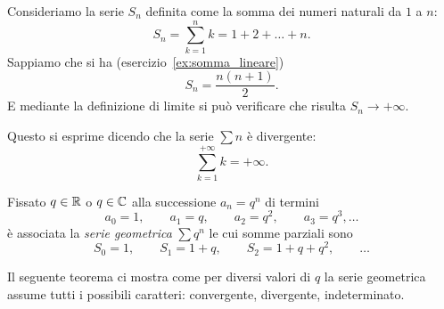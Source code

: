 \begin{example}
Consideriamo la serie $S_n$ definita
come la somma dei numeri naturali da $1$ a $n$:
\[
  S_n = \sum_{k=1}^n k = 1 + 2 + \dots + n.
\]
Sappiamo che si ha (esercizio~\ref{ex:somma_lineare})
\[
  S_n = \frac{n(n+1)}{2}.
\]
E mediante la definizione di limite si può verificare che
risulta $S_n \to +\infty$.

Questo si esprime dicendo che la serie $\sum n$ è divergente:
\[
     \sum_{k=1}^{+\infty} k = +\infty.
\]
\end{example}

\begin{example}
Fissato $q \in {\mathbb R}$ o $q\in {\mathbb C}$ alla successione
$  a_n = q^n$
di termini
\[
  a_0 = 1,\qquad
  a_1 = q,\qquad
  a_2 = q^2,\qquad
  a_3 = q^3, \dots
\]
è associata la
\emph{serie geometrica}%
%
$\sum q^n$
le cui somme parziali sono
\[
  S_0 = 1, \qquad
  S_1 = 1 + q, \qquad
  S_2 = 1 + q + q^2, \qquad
  \dots
\]
\end{example}

Il seguente teorema ci mostra come per diversi valori di $q$
la serie geometrica assume
tutti i possibili caratteri:
convergente, divergente, indeterminato.

